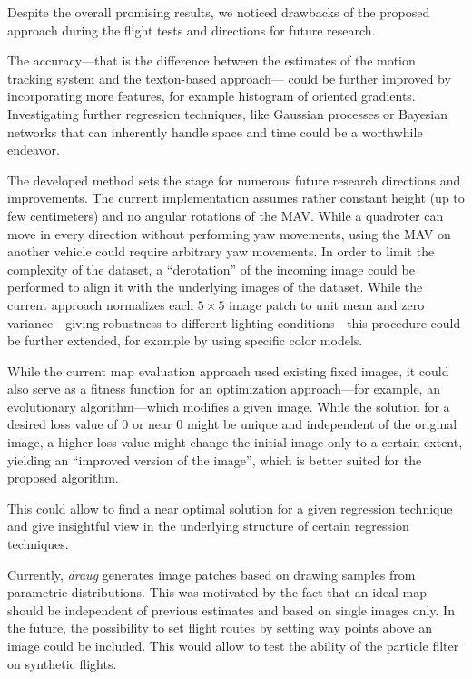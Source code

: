 Despite the overall promising results, we noticed drawbacks of the proposed approach
during the flight tests and directions for future research.

The accuracy—that is the difference between the estimates of the motion tracking system and the texton-based approach—
could be further improved by incorporating more features, for example
histogram of oriented gradients. Investigating further regression
techniques, like Gaussian processes or Bayesian networks that can
inherently handle space and time could be a worthwhile endeavor.

The developed method sets the stage for numerous future research
directions and improvements. The current implementation assumes rather
constant height (up to few centimeters) and no angular rotations of
the MAV. While a quadroter can move in every direction without
performing yaw movements, using the MAV on another vehicle could
require arbitrary yaw movements. In order to limit the complexity of
the dataset, a ``derotation'' of the incoming image could be performed
to align it with the underlying images of the dataset. While the
current approach normalizes each $5\times5$ image patch to unit mean
and zero variance---giving robustness to different lighting
conditions---this procedure could be further extended, for example by
using specific color models.

While the current map evaluation approach used existing fixed images,
it could also serve as a fitness function for an optimization
approach---for example, an evolutionary algorithm---which modifies a
given image. While the solution for a desired loss value of 0 or near 0 might be unique and independent of the original image, a higher loss value might change the initial image only to a certain extent, yielding an “improved version of the image”, which is better suited for the proposed algorithm. 

This could allow to find a near optimal solution for a
given regression technique and give insightful view in the underlying
structure of certain regression techniques.

Currently, \emph{draug} generates image patches based on drawing
samples from parametric distributions. This was motivated by the fact that an ideal map should be independent of previous estimates and based on single images only.  
In the future, the
possibility to set flight routes by setting way points above an image could be included. This would allow
to test the ability of the particle filter on synthetic flights.

